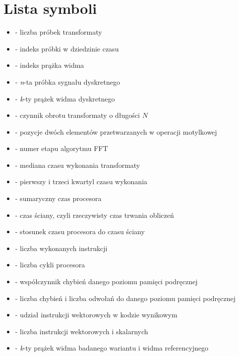 \chapter*{Lista symboli}

\begin{itemize}[noitemsep,topsep=0pt,parsep=0pt,partopsep=0pt,labelwidth=2cm,leftmargin=2.3cm,align=left,itemindent=0pt]
\item[\(N\)] - liczba próbek transformaty
\item[\(n\)] - indeks próbki w dziedzinie czasu
\item[\(k\)] - indeks prążka widma
\item[\(x(n)\)] - \textit{n}-ta próbka sygnału dyskretnego
\item[\(X(k)\)] - \textit{k}-ty prążek widma dyskretnego
\item[\(W_N\)] - czynnik obrotu transformaty o długości \(N\)
\item[\(p,\, q\)] - pozycje dwóch elementów przetwarzanych w operacji motylkowej
\item[\(s\)] - numer etapu algorytmu FFT
\item[\(t_{1/2}\)] - mediana czasu wykonania transformaty
\item[\(Q_1,\, Q_3\)] - pierwszy i trzeci kwartyl czasu wykonania
\item[\(t_{\mathrm{CPU}}\)] - sumaryczny czas procesora
\item[\(t_{\mathrm{wall}}\)] - czas ściany, czyli rzeczywisty czas trwania obliczeń
\item[\(R\)] - stosunek czasu procesora do czasu ściany
\item[\(I\)] - liczba wykonanych instrukcji
\item[\(C\)] - liczba cykli procesora
\item[\(m\)] - współczynnik chybień danego poziomu pamięci podręcznej
\item[\(r,\, a\)] - liczba chybień i liczba odwołań do danego poziomu pamięci podręcznej
\item[\(v\)] - udział instrukcji wektorowych w kodzie wynikowym
\item[\(n_{\mathrm{SIMD}},\, n_{\mathrm{skal}}\)] - liczba instrukcji wektorowych i skalarnych
\item[\(X_k,\, X_k^{\mathrm{ref}}\)] - \textit{k}-ty prążek widma badanego wariantu i widma referencyjnego
\end{itemize}
